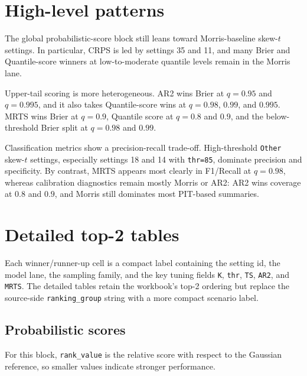 \documentclass[11pt]{article}
\begin{document}
\section{High-level patterns}

The global probabilistic-score block still leans toward Morris-baseline
skew-\(t\) settings. In particular, CRPS is led by settings 35 and 11, and many
Brier and Quantile-score winners at low-to-moderate quantile levels remain in
the Morris lane.

Upper-tail scoring is more heterogeneous. AR2 wins Brier at \(q=0.95\) and
\(q=0.995\), and it also takes Quantile-score wins at \(q=0.98\), \(0.99\), and
\(0.995\). MRTS wins Brier at \(q=0.9\), Quantile score at \(q=0.8\) and
\(0.9\), and the below-threshold Brier split at \(q=0.98\) and \(0.99\).

Classification metrics show a precision-recall trade-off. High-threshold
\texttt{Other} skew-\(t\) settings, especially settings 18 and 14 with
\texttt{thr=85}, dominate precision and specificity. By contrast, MRTS appears
most clearly in F1/Recall at \(q=0.98\), whereas calibration diagnostics remain
mostly Morris or AR2: AR2 wins coverage at \(0.8\) and \(0.9\), and Morris
still dominates most PIT-based summaries.

\clearpage
\section{Detailed top-2 tables}

Each winner/runner-up cell is a compact label containing the setting id, the
model lane, the sampling family, and the key tuning fields
\texttt{K}, \texttt{thr}, \texttt{TS}, \texttt{AR2}, and \texttt{MRTS}. The
detailed tables retain the workbook's top-2 ordering but replace the
source-side \texttt{ranking\_group} string with a more compact scenario label.

\subsection{Probabilistic scores}

For this block, \texttt{rank\_value} is the relative score with respect to the
Gaussian reference, so smaller values indicate stronger performance.
\end{document}
